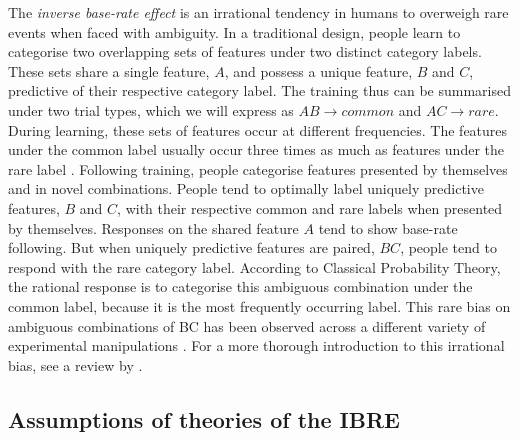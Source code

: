 \documentclass[10pt,letterpaper]{article}
\begin{document}
The \textit{inverse base-rate effect} \cite<IBRE, >{medin1988problem} is an irrational tendency in humans to overweigh rare events when faced with ambiguity.
In a traditional design, people learn to categorise two overlapping sets of features under two distinct category labels.
These sets share a single feature, $A$, and possess a unique feature, $B$ and $C$, predictive of their respective category label.
The training thus can be summarised under two trial types, which we will express as $AB \to common$ and $AC \to rare$.
During learning, these sets of features occur at different frequencies.
The features under the common label usually occur three times as much as features under the rare label \cite{kruschke1996base}.
Following training, people categorise features presented by themselves and in novel combinations.
People tend to optimally label uniquely predictive features, $B$ and $C$, with their respective common and rare labels when presented by themselves.
Responses on the shared feature $A$ tend to show base-rate following.
But when uniquely predictive features are paired, $BC$, people tend to respond with the rare category label.
According to Classical Probability Theory, the rational response is to categorise this ambiguous combination under the common label, because it is the most frequently occurring label.
This rare bias on ambiguous combinations of BC has been observed across a different variety of experimental manipulations \cite{kalish2001inverse,don2017effects,don2021attention,inkster2022effect,wills2014attention}.
For a more thorough introduction to this irrational bias, see a review by .

\subsection{Assumptions of theories of the IBRE}
\end{document}
